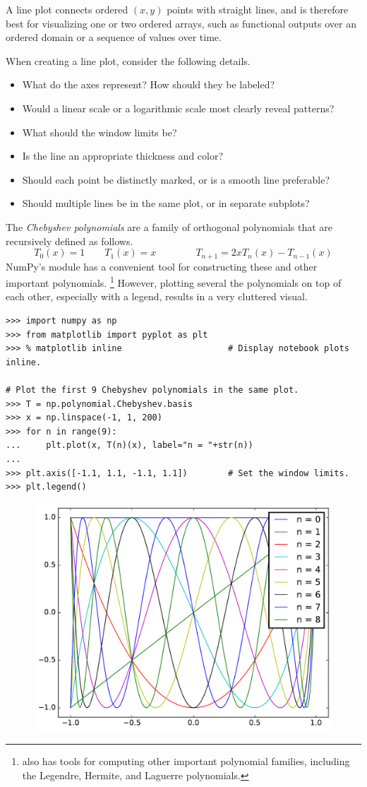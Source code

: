 A line plot connects ordered $(x,y)$ points with straight lines, and is therefore best for visualizing one or two ordered arrays, such as functional outputs over an ordered domain or a sequence of values over time.

When creating a line plot, consider the following details.
%
\begin{itemize}
    \item What do the axes represent? How should they be labeled?
    \item Would a linear scale or a logarithmic scale most clearly reveal patterns?
    \item What should the window limits be?
    \item Is the line an appropriate thickness and color?
    \item Should each point be distinctly marked, or is a smooth line preferable?
    \item Should multiple lines be in the same plot, or in separate subplots?
\end{itemize}

The \emph{Chebyshev polynomials} are a family of orthogonal polynomials that are recursively defined as follows.
\[T_0(x) = 1 \qquad T_1(x) = x \qquad\qquad T_{n+1} = 2xT_n(x) - T_{n-1}(x)\]
NumPy's  module has a convenient tool for constructing these and other important polynomials.%
\footnote{ also has tools for computing other important polynomial families, including the Legendre, Hermite, and Laguerre polynomials.}
However, plotting several the polynomials on top of each other, especially with a legend, results in a very cluttered visual.

\begin{lstlisting}
>>> import numpy as np
>>> from matplotlib import pyplot as plt
>>> % matplotlib inline                     # Display notebook plots inline.

# Plot the first 9 Chebyshev polynomials in the same plot.
>>> T = np.polynomial.Chebyshev.basis
>>> x = np.linspace(-1, 1, 200)
>>> for n in range(9):
...     plt.plot(x, T(n)(x), label="n = "+str(n))
...
>>> plt.axis([-1.1, 1.1, -1.1, 1.1])        # Set the window limits.
>>> plt.legend()
\end{lstlisting}

\begin{figure}[H] %
    \centering
    \includegraphics[width=.7\linewidth]{figures/chebyshev_bad.pdf}
\end{figure}

